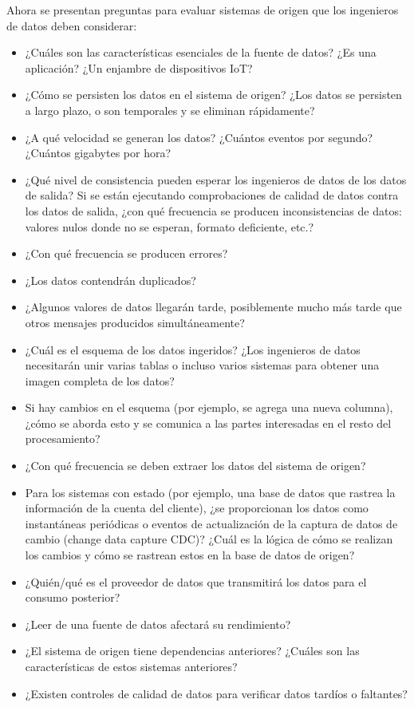 \documentclass[12pt]{book}
\begin{document}
Ahora se presentan preguntas para evaluar sistemas de origen que los ingenieros de datos deben considerar:
\begin{itemize}
    \item ¿Cuáles son las características esenciales de la fuente de datos? ¿Es una aplicación? ¿Un enjambre de dispositivos IoT?
    \item ¿Cómo se persisten los datos en el sistema de origen? ¿Los datos se persisten a largo plazo, o son temporales y se eliminan rápidamente?
    \item ¿A qué velocidad se generan los datos? ¿Cuántos eventos por segundo? ¿Cuántos gigabytes por hora?
    \item ¿Qué nivel de consistencia pueden esperar los ingenieros de datos de los datos de salida? Si se están ejecutando comprobaciones de calidad de datos contra los datos de salida, ¿con qué frecuencia se producen inconsistencias de datos: valores nulos donde no se esperan, formato deficiente, etc.?
    \item ¿Con qué frecuencia se producen errores?
    \item ¿Los datos contendrán duplicados?
    \item ¿Algunos valores de datos llegarán tarde, posiblemente mucho más tarde que otros mensajes producidos simultáneamente?
    \item ¿Cuál es el esquema de los datos ingeridos? ¿Los ingenieros de datos necesitarán unir varias tablas o incluso varios sistemas para obtener una imagen completa de los datos?
    \item Si hay cambios en el esquema (por ejemplo, se agrega una nueva columna), ¿cómo se aborda esto y se comunica a las partes interesadas en el resto del procesamiento?
    \item ¿Con qué frecuencia se deben extraer los datos del sistema de origen?
    \item Para los sistemas con estado (por ejemplo, una base de datos que rastrea la información de la cuenta del cliente), ¿se proporcionan los datos como instantáneas periódicas o eventos de actualización de la captura de datos de cambio (change data capture CDC)? ¿Cuál es la lógica de cómo se realizan los cambios y cómo se rastrean estos en la base de datos de origen?
    \item ¿Quién/qué es el proveedor de datos que transmitirá los datos para el consumo posterior?
    \item ¿Leer de una fuente de datos afectará su rendimiento?
    \item ¿El sistema de origen tiene dependencias anteriores? ¿Cuáles son las características de estos sistemas anteriores?
    \item ¿Existen controles de calidad de datos para verificar datos tardíos o faltantes?
\end{itemize}
\end{document}
